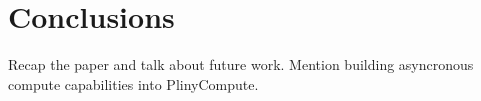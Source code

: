 
\section{Conclusions}

Recap the paper and talk about future work.  Mention building 
asyncronous compute capabilities into PlinyCompute.

